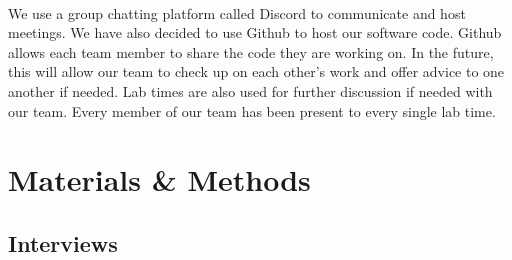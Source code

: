 \documentclass[titlepage]{article}
\begin{document}
        \paragraph{}
        We use a group chatting platform called Discord to communicate and host meetings. We have also decided to use Github to host our software code. Github allows each team member to share the code they are working on. In the future, this will allow our team to check up on each other’s work and offer advice to one another if needed. Lab times are also used for further discussion if needed with our team. Every member of our team has been present to every single lab time.

\section{Materials \& Methods}
    \subsection{Interviews}
\end{document}
